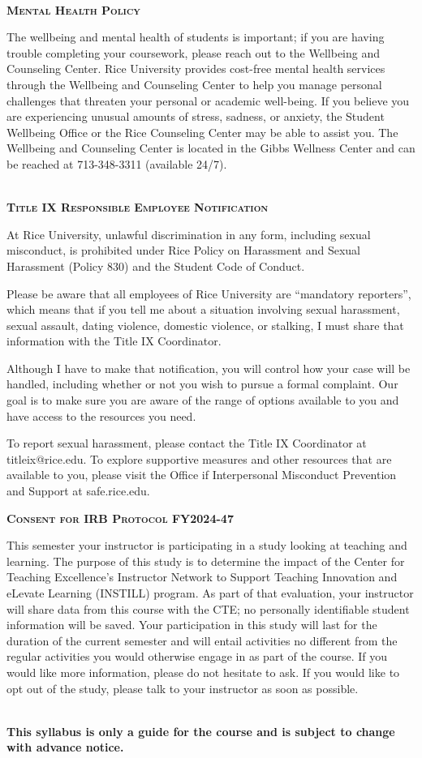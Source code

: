 \documentclass[11pt]{article}
\begin{document}
~\\
\textbf{\textsc{Mental Health Policy}}
\begin{adjustwidth}{1cm}{0cm}
	The wellbeing and mental health of students is important; if you are having trouble completing your coursework, please reach out to the Wellbeing and Counseling Center. Rice University provides cost-free mental health services through the Wellbeing and Counseling Center to help you manage personal challenges that threaten your personal or academic well-being. If you believe you are experiencing unusual amounts of stress, sadness, or anxiety, the Student Wellbeing Office or the Rice Counseling Center may be able to assist you. The Wellbeing and Counseling Center is located in the Gibbs Wellness Center and can be reached at 713-348-3311 (available 24/7).
\end{adjustwidth}

~\\
\textbf{\textsc{Title IX Responsible Employee Notification}}
\begin{adjustwidth}{1cm}{0cm}
  At Rice University, unlawful discrimination in any form, including sexual misconduct, is prohibited under Rice Policy on Harassment and Sexual Harassment (Policy 830) and the Student Code of Conduct.

  Please be aware that all employees of Rice University are ``mandatory reporters'', which means that if you tell me about a situation involving sexual harassment, sexual assault, dating violence, domestic violence, or stalking, I must share that information with the Title IX Coordinator.

  Although I have to make that notification, you will control how your case will be handled, including whether or not you wish to pursue a formal complaint. Our goal is to make sure you are aware of the range of options available to you and have access to the resources you need.

  To report sexual harassment, please contact the Title IX Coordinator at titleix@rice.edu. To explore supportive measures and other resources that are available to you, please visit the Office if Interpersonal Misconduct Prevention and Support at safe.rice.edu.
\end{adjustwidth}

\newpage
\textbf{\textsc{Consent for IRB Protocol FY2024-47}}
\begin{adjustwidth}{1cm}{0cm}
  This semester your instructor is participating in a study looking at teaching and learning. The purpose of this study is to determine the impact of the Center for Teaching Excellence's Instructor Network to Support Teaching Innovation and eLevate Learning (INSTILL) program. As part of that evaluation, your instructor will share data from this course with the CTE; no personally identifiable student information will be saved. Your participation in this study will last for the duration of the current semester and will entail activities no different from the regular activities you would otherwise engage in as part of the course. If you would like more information, please do not hesitate to ask.  If you would like to opt out of the study, please talk to your instructor as soon as possible.
\end{adjustwidth}

~\\
\textbf{This syllabus is only a guide for the course and is subject to change with advance notice.}
\end{document}
